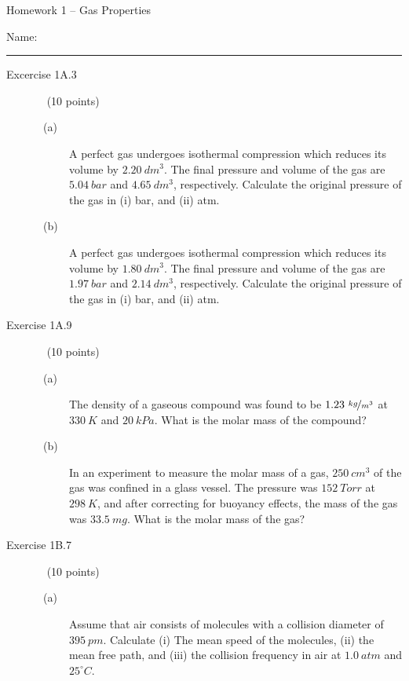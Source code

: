\documentclass[12pt, openany, letterpaper]{memoir}
\begin{document}
\begin{center}
	{\large Homework 1 -- Gas Properties}
	
\end{center}

Name: \rule[-.1mm]{15em}{0.1pt}

\begin{description}
	\item [Excercise 1A.3] ~ (10 points)
	\begin{description}
		\item [~(a)~~] A perfect gas undergoes isothermal compression which reduces its volume by $2.20~dm^3$. The final pressure and volume of the gas are $5.04~bar$ and $4.65~dm^3$, respectively. Calculate the original pressure of the gas in (i) bar, and (ii) atm.
		
		\vspace{6em}
		\item [~(b)~~] A perfect gas undergoes isothermal compression which reduces its volume by $1.80~dm^3$. The final pressure and volume of the gas are $1.97~bar$ and $2.14~dm^3$, respectively. Calculate the original pressure of the gas in (i) bar, and (ii) atm.
				
		\vspace{6em}
	\end{description} 
	\item [Exercise 1A.9] ~ (10 points)
	\begin{description}
		\item [~(a)~~] The density of a gaseous compound was found to be $1.23~\nicefrac{kg}{m^3}$ at $330~K$ and $20~kPa$. What is the molar mass of the compound?
		
		\vspace{9em}
		\item [~(b)~~] In an experiment to measure the molar mass of a gas, $250~cm^3$ of the gas was confined in a glass vessel. The pressure was $152~Torr$ at $298~K$, and after correcting for buoyancy effects, the mass of the gas was $33.5~mg$. What is the molar mass of the gas?
				
		\vspace{9em}
	\end{description} 
	\item [Exercise 1B.7] ~ (10 points)
	\begin{description}
		\item [~(a)~~] Assume that air consists of  molecules with a collision diameter of $395~pm$. Calculate (i) The mean speed of the molecules, (ii) the mean free path, and (iii) the collision frequency in air at $1.0~atm$ and $25^\circ C$.
		

\end{description}
\end{description}
\end{document}
